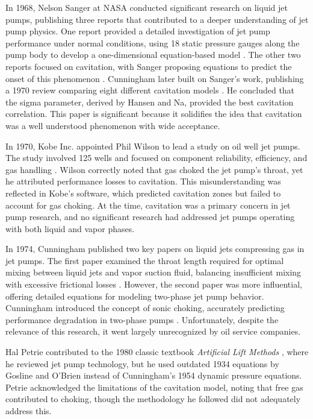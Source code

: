 \documentclass[../ellis_thesis.tex]{subfiles}
\begin{document}
In 1968, Nelson Sanger at NASA conducted significant research on liquid jet pumps, publishing three reports that contributed to a deeper understanding of jet pump physics. One report provided a detailed investigation of jet pump performance under normal conditions, using 18 static pressure gauges along the pump body to develop a one-dimensional equation-based model \cite{sanger_non_cav}. The other two reports focused on cavitation, with Sanger proposing equations to predict the onset of this phenomenon \cite{sanger_cav}. Cunningham later built on Sanger’s work, publishing a 1970 review comparing eight different cavitation models \cite{cunn_cav}. He concluded that the sigma parameter, derived by Hansen and Na, provided the best cavitation correlation. This paper is significant because it solidifies the idea that cavitation was a well understood phenomenon with wide acceptance.

In 1970, Kobe Inc. appointed Phil Wilson to lead a study on oil well jet pumps. The study involved 125 wells and focused on component reliability, efficiency, and gas handling \cite{wilson_status}. Wilson correctly noted that gas choked the jet pump’s throat, yet he attributed performance losses to cavitation. This misunderstanding was reflected in Kobe's software, which predicted cavitation zones but failed to account for gas choking. At the time, cavitation was a primary concern in jet pump research, and no significant research had addressed jet pumps operating with both liquid and vapor phases.

In 1974, Cunningham published two key papers on liquid jets compressing gas in jet pumps. The first paper examined the throat length required for optimal mixing between liquid jets and vapor suction fluid, balancing insufficient mixing with excessive frictional losses \cite{cunn_break}. However, the second paper was more influential, offering detailed equations for modeling two-phase jet pump behavior. Cunningham introduced the concept of sonic choking, accurately predicting performance degradation in two-phase pumps \cite{cunn_gas}. Unfortunately, despite the relevance of this research, it went largely unrecognized by oil service companies.

Hal Petrie contributed to the 1980 classic textbook \emph{Artificial Lift Methods} \cite{kermit}, where he reviewed jet pump technology, but he used outdated 1934 equations by Gosline and O’Brien \cite{gosline} instead of Cunningham’s 1954 dynamic pressure equations. Petrie acknowledged the limitations of the cavitation model, noting that free gas contributed to choking, though the methodology he followed did not adequately address this.
\end{document}
